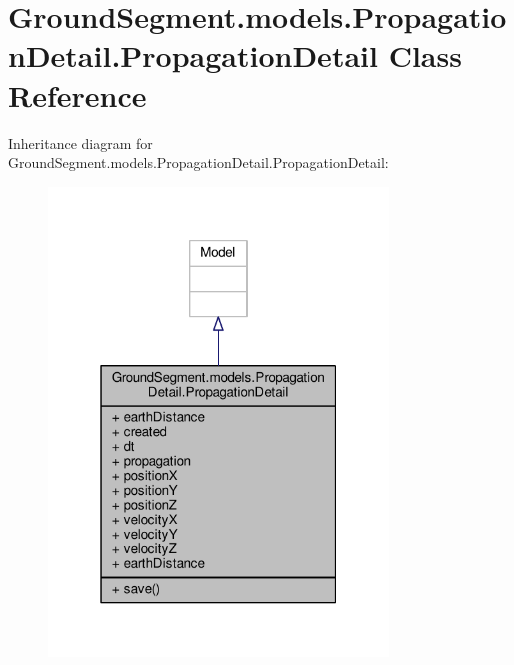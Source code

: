 \hypertarget{class_ground_segment_1_1models_1_1_propagation_detail_1_1_propagation_detail}{}\section{Ground\+Segment.\+models.\+Propagation\+Detail.\+Propagation\+Detail Class Reference}
\label{class_ground_segment_1_1models_1_1_propagation_detail_1_1_propagation_detail}


Inheritance diagram for Ground\+Segment.\+models.\+Propagation\+Detail.\+Propagation\+Detail\+:\nopagebreak
\begin{figure}[H]
\begin{center}
\leavevmode
\includegraphics[width=256pt]{class_ground_segment_1_1models_1_1_propagation_detail_1_1_propagation_detail__inherit__graph}
\end{center}
\end{figure}


